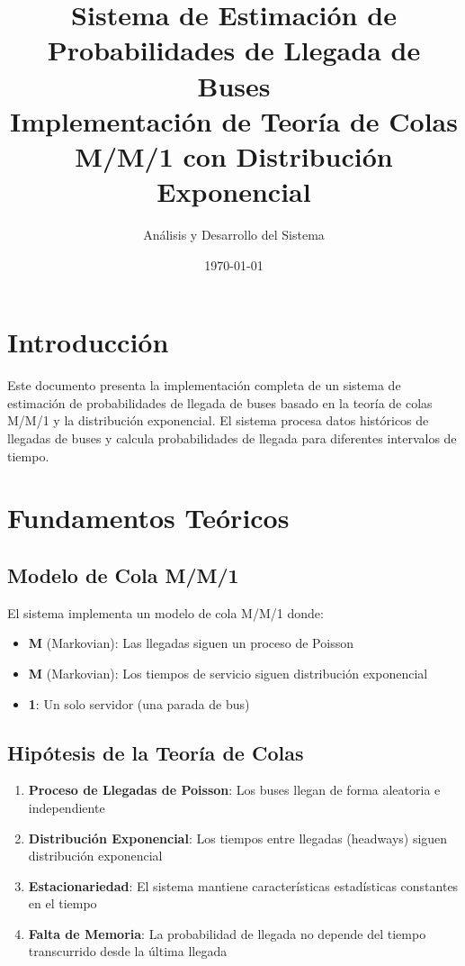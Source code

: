 \documentclass[12pt,a4paper]{article}
\title{Sistema de Estimación de Probabilidades de Llegada de Buses\\
\large Implementación de Teoría de Colas M/M/1 con Distribución Exponencial}
\author{Análisis y Desarrollo del Sistema}
\date{\today}
\begin{document}
\maketitle

\tableofcontents
\newpage

\section{Introducción}

Este documento presenta la implementación completa de un sistema de estimación de probabilidades de llegada de buses basado en la teoría de colas M/M/1 y la distribución exponencial. El sistema procesa datos históricos de llegadas de buses y calcula probabilidades de llegada para diferentes intervalos de tiempo.

\section{Fundamentos Teóricos}

\subsection{Modelo de Cola M/M/1}

El sistema implementa un modelo de cola M/M/1 donde:

\begin{itemize}
    \item \textbf{M} (Markovian): Las llegadas siguen un proceso de Poisson
    \item \textbf{M} (Markovian): Los tiempos de servicio siguen distribución exponencial
    \item \textbf{1}: Un solo servidor (una parada de bus)
\end{itemize}

\subsection{Hipótesis de la Teoría de Colas}

\begin{enumerate}
    \item \textbf{Proceso de Llegadas de Poisson}: Los buses llegan de forma aleatoria e independiente
    \item \textbf{Distribución Exponencial}: Los tiempos entre llegadas (headways) siguen distribución exponencial
    \item \textbf{Estacionariedad}: El sistema mantiene características estadísticas constantes en el tiempo
    \item \textbf{Falta de Memoria}: La probabilidad de llegada no depende del tiempo transcurrido desde la última llegada
\end{enumerate}
\end{document}
